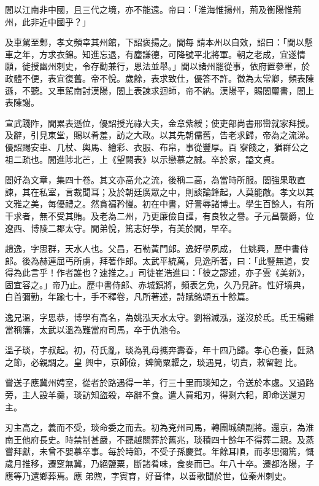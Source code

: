 \begin{pinyinscope}
 閭以江南非中國，且三代之境，亦不能遠。帝曰：「淮海惟揚州，荊及衡陽惟荊州，此非近中國乎？」



 及車駕至鄴，孝文頻幸其州館，下詔褒揚之。閭每
 請本州以自效，詔曰：「閭以懸車之年，方求衣錦。知進忘退，有塵謙德，可降號平北將軍。朝之老成，宜遂情願，徙授幽州刺史，令存勸兼行，恩法並舉。」閭以諸州罷從事，依府置參軍，於政體不便，表宜復舊。帝不悅。歲餘，表求致仕，優答不許。徵為太常卿，頻表陳遜，不聽。又車駕南討漢陽，閭上表諫求迴師，帝不納。漢陽平，賜閭璽書，閭上表陳謝。



 宣武踐阼，閭累表遜位，優詔授光祿大夫，金章紫綬；使吏部尚書邢巒就家拜授。及辭，引見東堂，賜以肴羞，訪之大政。以其先朝儒舊，告老求歸，帝為之流涕。優詔賜安車、几杖、輿馬、繪彩、衣服、布帛，事從豐厚。百
 寮餞之，猶群公之祖二疏也。閭進陟北芒，上《望闕表》以示戀慕之誠。卒於家，謚文貞。



 閭好為文章，集四十卷。其文亦高允之流，後稱二高，為當時所服。閭強果敢直諫，其在私室，言裁聞耳；及於朝廷廣眾之中，則談論鋒起，人莫能敵。孝文以其文雅之美，每優禮之。然貪褊矜慢。初在中書，好詈辱諸博士。學生百餘人，有所干求者，無不受其賄。及老為二州，乃更廉儉自謹，有良牧之譽。子元昌襲爵，位遼西、博陵二郡太守。閭弟悅，篤志好學，有美於閭，早卒。



 趙逸，字思群，天水人也。父昌，石勒黃門郎。逸好學夙成，
 仕姚興，歷中書侍郎。後為赫連屈丐所虜，拜著作郎。太武平統萬，見逸所著，曰：「此豎無道，安得為此言乎！作者誰也？速推之。」司徒崔浩進曰：「彼之謬述，亦子雲《美新》，固宜容之。」帝乃止。歷中書侍郎、赤城鎮將，頻表乞免，久乃見許。性好墳典，白首彌勤，年踰七十，手不釋卷，凡所著述，詩賦銘頌五十餘篇。



 逸兄溫，字思恭，博學有高名，為姚泓天水太守。劉裕滅泓，遂沒於氐。氐王楊難當稱籓，太武以溫為難當府司馬，卒于仇池令。



 溫子琰，字叔起。初，苻氏亂，琰為乳母攜奔壽春，年十四乃歸。孝心色養，飪熟之節，必親調之。皇
 興中，京師儉，婢簡粟糶之，琰遇見，切責，敕留輕比。



 嘗送子應冀州娉室，從者於路遇得一羊，行三十里而琰知之，令送於本處。又過路旁，主人設羊羹，琰訪知盜殺，卒辭不食。遣人買耜刃，得剩六耜，即命送還刃主。



 刃主高之，義而不受，琰命委之而去。初為兗州司馬，轉團城鎮副將。還京，為淮南王他府長史。時禁制甚嚴，不聽越關葬於舊兆，琰積四十餘年不得葬二親。及蒸嘗拜獻，未曾不嬰慕卒事。每於時節，不受子孫慶賀。年餘耳順，而孝思彌篤，慨歲月推移，遷窆無冀，乃絕鹽粟，斷諸肴味，食麥而已。年八十卒。遷都洛陽，子應等乃還鄉葬焉。應
 弟煦，字賓育，好音律，以善歌聞於世，位秦州刺史。




\end{pinyinscope}
